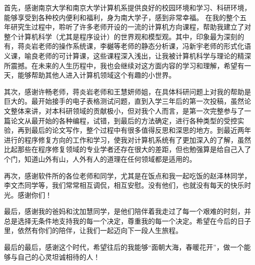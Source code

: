 \begin{acknowledgement}

首先，感谢南京大学和南京大学计算机系提供良好的校园环境和学习、科研环境，能够享受到各种校内便利和福利，身为南大学子，感到非常幸福。
在我的整个五年研究生过程中，聆听了许多老师开设的一流的计算机方向课程，帮助我建立了对整个计算机科学（尤其是程序设计）的世界观和模型观。其中，印象最为深刻的有，蒋炎岩老师的操作系统课，李樾等老师的静态分析课，冯新宇老师的形式化语义课，喻良老师的可计算课，这些课程深入浅出，让我被计算机科学与理论的精深所震撼。在未来的人生历程中，我也会继续对这方面内容的学习和理解，希望有一天，能够帮助其他人进入计算机领域这个有趣的小世界。

其次，感谢许畅老师，蒋炎岩老师和王慧妍师姐，在具体科研问题上对我的帮助是巨大的。最开始接手的电子表格测试问题，直到入学三年后的第一次投稿，虽然论文整体来讲，对本科研领域的贡献极小，但对我个人而言，是第一次完整参与了一篇论文从最开始的各种编程，试错，到最后的方法确定，进行各种类型的受控实验，再到最后的论文写作，整个过程中有很多值得反思和深思的地方。到最近两年进行的程序修复方向的工作和学习，使我对计算机系统有了更加深入的了解，虽然比起那些在程序修复领域的专业学者还存在很大的差距，但也勉强算是给自己入了个门，知道山外有山，人外有人的道理在任何领域都是适用的。

再次，感谢软件所的各位老师和同学，尤其是在饭点和我一起吃饭的赵泽林同学，李文杰同学等，我们常常相互调侃，相互安慰。没有他们，也就没有每天的快乐时光。感谢你们！

最后，感谢我的爸妈和沈加慧同学，是他们陪伴着我走过了每一个艰难的时刻，并总是选择无条件地支持我的每一个决定，尊重我的每一个决定。希望在今后的日子里，依然有你们的陪伴，让我们一起迈向下一段人生旅程。

最后的最后，感谢这个时代，希望往后的我能够“面朝大海，春暖花开”，做一个能够与自己的心灵坦诚相待的人！

\end{acknowledgement}